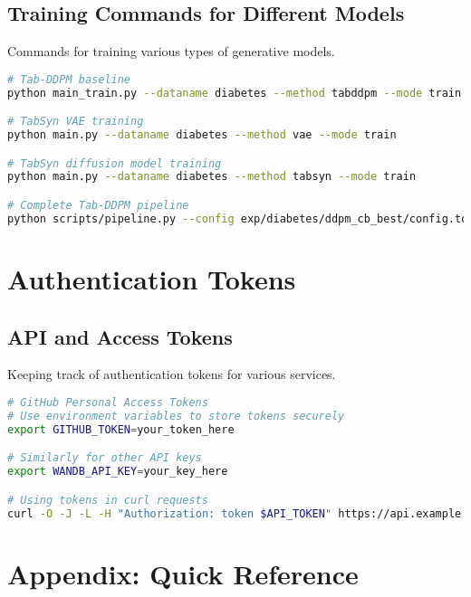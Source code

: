 \documentclass{article}
\begin{document}
\subsection{Training Commands for Different Models}
Commands for training various types of generative models.

\begin{tcolorbox}[colback=olive!5!white, colframe=olive!75!black, title=Training Pipeline Commands]
\begin{lstlisting}[language=bash]
# Tab-DDPM baseline
python main_train.py --dataname diabetes --method tabddpm --mode train

# TabSyn VAE training
python main.py --dataname diabetes --method vae --mode train

# TabSyn diffusion model training
python main.py --dataname diabetes --method tabsyn --mode train

# Complete Tab-DDPM pipeline
python scripts/pipeline.py --config exp/diabetes/ddpm_cb_best/config.toml --train --sample --eval
\end{lstlisting}
\end{tcolorbox}

\section{Authentication Tokens}

\subsection{API and Access Tokens}
Keeping track of authentication tokens for various services.

\begin{tcolorbox}[colback=yellow!5!white, colframe=yellow!75!black, title=Authentication Token Management]
\begin{lstlisting}[language=bash]
# GitHub Personal Access Tokens
# Use environment variables to store tokens securely
export GITHUB_TOKEN=your_token_here

# Similarly for other API keys
export WANDB_API_KEY=your_key_here

# Using tokens in curl requests
curl -O -J -L -H "Authorization: token $API_TOKEN" https://api.example.com/resource
\end{lstlisting}
\end{tcolorbox}

\section{Appendix: Quick Reference}
\end{document}
